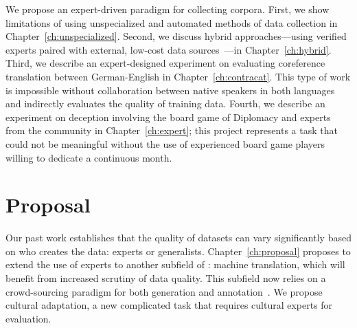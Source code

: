 We propose an expert-driven paradigm for collecting \nlp{} corpora.  
%
First, we show limitations of using unspecialized and automated methods of data collection in Chapter~\ref{ch:unspecialized}.
%
Second, we discuss hybrid approaches---using verified experts paired with external, low-cost data sources~\citep{vukovic2010towards}---in Chapter~\ref{ch:hybrid}.
%
Third, we describe an expert-designed experiment on evaluating coreference translation between German-English in Chapter~\ref{ch:contracat}.  This type of work is impossible without collaboration between native speakers in both languages and indirectly evaluates the quality of training data.    
%
Fourth, we describe an experiment on deception involving the board game of Diplomacy and experts from the community in Chapter~\ref{ch:expert}; this project represents a task that could not be meaningful without the use of experienced board game players willing to dedicate a continuous month.  
%



\section{Proposal}

Our past work establishes that the quality of datasets can vary significantly based on who creates the data: experts or generalists.  
%
Chapter~\ref{ch:proposal} proposes to extend the use of experts to another subfield of \nlp{}: machine translation, which will benefit from increased scrutiny of data quality.    
%
This subfield now relies on a crowd-sourcing paradigm for both generation and annotation~\citep{cer2017semeval, tydiqa}.
%
We propose cultural adaptation, a new complicated task that requires cultural experts for evaluation.  
%

